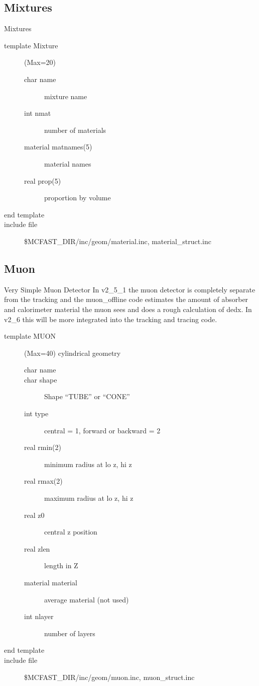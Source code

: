 \subsection{Mixtures}  Mixtures
\begin{description}
\item[{\rm template} Mixture](Max=20)
\begin{description}
\item[{\rm  char} name]            mixture name
\item[{\rm  int} nmat]             number of materials
\item[{\rm  material} matnames(5)]     material names
\item[{\rm  real} prop(5)]         proportion by volume
\end{description}
\item[end template]
\item[include file] \$MCFAST\_DIR/inc/geom/material.inc,
material\_struct.inc
\end{description}

\filbreak

\subsection{Muon}  Very Simple Muon Detector
In v2\_5\_1 the muon detector is completely separate from the tracking and the muon\_offline
code estimates the amount of absorber and calorimeter material the muon sees and does a
rough calculation of dedx.   In v2\_6 this will be more integrated into the tracking and
tracing code. 
\begin{description}
\item[{\rm template} MUON](Max=40)  cylindrical geometry
\begin{description}
\item[{\rm  char} name]
\item[{\rm  char} shape]   Shape ``TUBE'' or ``CONE''
\item[{\rm  int} type]        central = 1, forward or backward = 2
\item[{\rm  real} rmin(2)]    minimum radius at lo z, hi z
\item[{\rm  real} rmax(2)]    maximum radius at lo z, hi z
\item[{\rm  real} z0]         central z position
\item[{\rm  real} zlen]       length in Z
\item[{\rm  material} material]  average material (not used)
\item[{\rm  int} nlayer]      number of layers
\end{description}
\item[end template]
\item[include file] \$MCFAST\_DIR/inc/geom/muon.inc, muon\_struct.inc
\end{description}

